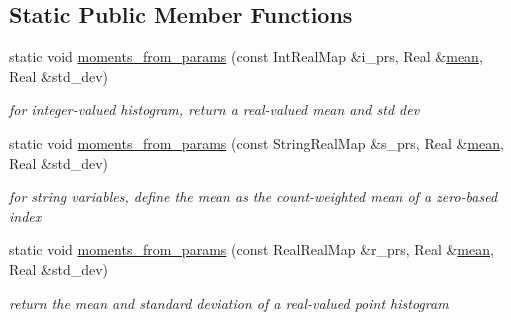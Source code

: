 \subsection*{Static Public Member Functions}
\begin{DoxyCompactItemize}
\item 
static void \hyperlink{classPecos_1_1HistogramPtRandomVariable_a537cfbfa4e5b2384e2095c67b5cdb7e5}{moments\+\_\+from\+\_\+params} (const Int\+Real\+Map \&i\+\_\+prs, Real \&\hyperlink{classPecos_1_1HistogramPtRandomVariable_a962ffe5a3593be370d5c883365c060f4}{mean}, Real \&std\+\_\+dev)\label{classPecos_1_1HistogramPtRandomVariable_a537cfbfa4e5b2384e2095c67b5cdb7e5}

\begin{DoxyCompactList}\small\item\em for integer-\/valued histogram, return a real-\/valued mean and std dev \end{DoxyCompactList}\item 
static void \hyperlink{classPecos_1_1HistogramPtRandomVariable_acd6cfaab41e83d38b5c26010662f3f57}{moments\+\_\+from\+\_\+params} (const String\+Real\+Map \&s\+\_\+prs, Real \&\hyperlink{classPecos_1_1HistogramPtRandomVariable_a962ffe5a3593be370d5c883365c060f4}{mean}, Real \&std\+\_\+dev)\label{classPecos_1_1HistogramPtRandomVariable_acd6cfaab41e83d38b5c26010662f3f57}

\begin{DoxyCompactList}\small\item\em for string variables, define the mean as the count-\/weighted mean of a zero-\/based index \end{DoxyCompactList}\item 
static void \hyperlink{classPecos_1_1HistogramPtRandomVariable_a7fb1ba456992e338dabbc1aa6b6c7f5d}{moments\+\_\+from\+\_\+params} (const Real\+Real\+Map \&r\+\_\+prs, Real \&\hyperlink{classPecos_1_1HistogramPtRandomVariable_a962ffe5a3593be370d5c883365c060f4}{mean}, Real \&std\+\_\+dev)\label{classPecos_1_1HistogramPtRandomVariable_a7fb1ba456992e338dabbc1aa6b6c7f5d}

\begin{DoxyCompactList}\small\item\em return the mean and standard deviation of a real-\/valued point histogram \end{DoxyCompactList}\end{DoxyCompactItemize}
